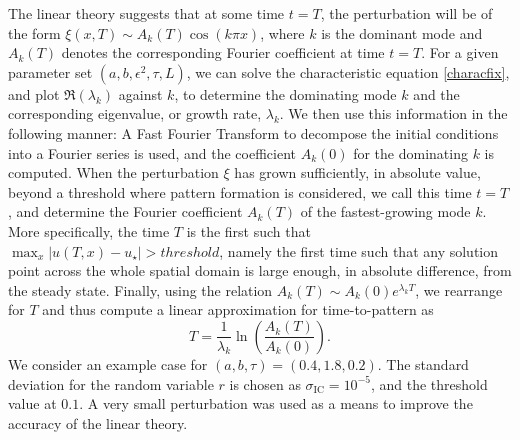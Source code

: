 The linear theory suggests that at some time $t=T$, the perturbation will be of the form $\xi(x,T)\sim A_k(T)\cos(k\pi x)$, where $k$ is the dominant mode and $A_k(T)$ denotes the corresponding Fourier coefficient at time $t=T$. For a given parameter set $(a,b,\epsilon^2,\tau,L)$, we can solve the characteristic equation \eqref{characfix}, and plot $\Re(\lambda_k)$
against $k$, to determine the dominating mode $k$ and the corresponding eigenvalue, or growth rate, $\lambda_k$. We then use this information in the following manner: A Fast Fourier Transform to decompose the initial conditions into a Fourier series is used, and the coefficient $A_k(0)$ for the dominating $k$ is computed. When the perturbation $\xi$ has grown sufficiently, in absolute value, beyond a threshold where pattern formation is considered, we call this time $t=T$, and determine the Fourier coefficient $A_k(T)$ of the fastest-growing mode $k$. More specifically, the time $T$ is the first such that $\max_x|u(T,x)-u_\star|>threshold$, namely the first time such that any solution point across the whole spatial domain is large enough, in absolute difference, from the steady state. Finally, using the relation $A_k(T)\sim A_k(0)e^{\lambda_k T}$, we rearrange for $T$ and thus compute a linear approximation for time-to-pattern as
\begin{equation}\label{ttprelation}
    T=\frac{1}{\lambda_k}\ln\left(\frac{A_k(T)}{A_k(0)}\right).
\end{equation}
We consider an example case for $(a,b,\tau)=(0.4,1.8,0.2)$. The standard deviation for the random variable $r$ is chosen as $\sigma_{\text{IC}}=10^{-5}$, and the threshold value at $0.1$. A very small perturbation was used as a means to improve the accuracy of the linear theory.
